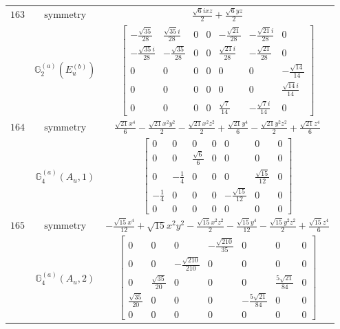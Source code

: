 \documentclass[fleqn,8pt,landscape]{jsarticle}
\begin{document}
\begin{longtable}{ccc}
$ 163 $ & $ \text{symmetry} $ & $ \frac{\sqrt{6} i x z}{2} + \frac{\sqrt{6} y z}{2} $ \\
$  $ & $ \mathbb{G}_{2}^{(a)}(E_{u}^{(b)}) $ & $ \begin{bmatrix} - \frac{\sqrt{35}}{28} & \frac{\sqrt{35} i}{28} & 0 & 0 & - \frac{\sqrt{21}}{28} & - \frac{\sqrt{21} i}{28} & 0 \\ - \frac{\sqrt{35} i}{28} & - \frac{\sqrt{35}}{28} & 0 & 0 & \frac{\sqrt{21} i}{28} & - \frac{\sqrt{21}}{28} & 0 \\ 0 & 0 & 0 & 0 & 0 & 0 & - \frac{\sqrt{14}}{14} \\ 0 & 0 & 0 & 0 & 0 & 0 & \frac{\sqrt{14} i}{14} \\ 0 & 0 & 0 & 0 & \frac{\sqrt{7}}{14} & - \frac{\sqrt{7} i}{14} & 0 \end{bmatrix} $ \\ \hline
$ 164 $ & $ \text{symmetry} $ & $ \frac{\sqrt{21} x^{4}}{6} - \frac{\sqrt{21} x^{2} y^{2}}{2} - \frac{\sqrt{21} x^{2} z^{2}}{2} + \frac{\sqrt{21} y^{4}}{6} - \frac{\sqrt{21} y^{2} z^{2}}{2} + \frac{\sqrt{21} z^{4}}{6} $ \\
$  $ & $ \mathbb{G}_{4}^{(a)}(A_{u},1) $ & $ \begin{bmatrix} 0 & 0 & 0 & 0 & 0 & 0 & 0 \\ 0 & 0 & \frac{\sqrt{6}}{6} & 0 & 0 & 0 & 0 \\ 0 & - \frac{1}{4} & 0 & 0 & 0 & \frac{\sqrt{15}}{12} & 0 \\ - \frac{1}{4} & 0 & 0 & 0 & - \frac{\sqrt{15}}{12} & 0 & 0 \\ 0 & 0 & 0 & 0 & 0 & 0 & 0 \end{bmatrix} $ \\ \hline
$ 165 $ & $ \text{symmetry} $ & $ - \frac{\sqrt{15} x^{4}}{12} + \sqrt{15} x^{2} y^{2} - \frac{\sqrt{15} x^{2} z^{2}}{2} - \frac{\sqrt{15} y^{4}}{12} - \frac{\sqrt{15} y^{2} z^{2}}{2} + \frac{\sqrt{15} z^{4}}{6} $ \\
$  $ & $ \mathbb{G}_{4}^{(a)}(A_{u},2) $ & $ \begin{bmatrix} 0 & 0 & 0 & - \frac{\sqrt{210}}{35} & 0 & 0 & 0 \\ 0 & 0 & - \frac{\sqrt{210}}{210} & 0 & 0 & 0 & 0 \\ 0 & \frac{\sqrt{35}}{20} & 0 & 0 & 0 & \frac{5 \sqrt{21}}{84} & 0 \\ \frac{\sqrt{35}}{20} & 0 & 0 & 0 & - \frac{5 \sqrt{21}}{84} & 0 & 0 \\ 0 & 0 & 0 & 0 & 0 & 0 & 0 \end{bmatrix} $ \\ \hline

\end{longtable}
\end{document}
